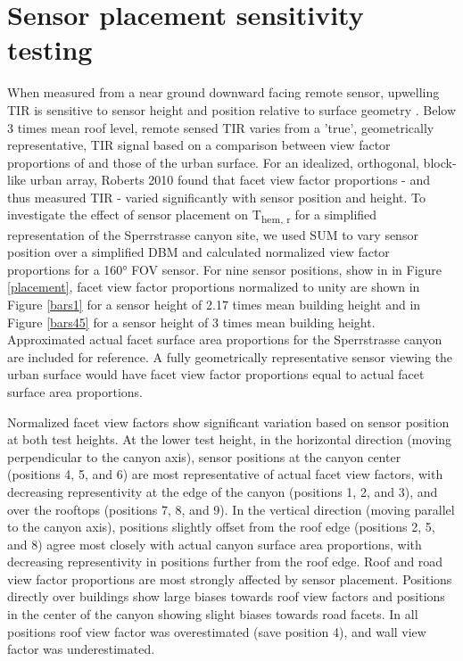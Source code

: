 \section{Sensor placement sensitivity testing} \label{Methodological limitations and considerations}

 When measured from a near ground downward facing remote sensor, upwelling TIR is sensitive to sensor height and position relative to surface geometry \cite{Adderley2015, Roberts2010}. Below 3 times mean roof level, remote sensed TIR varies from a 'true', geometrically representative, TIR signal based on a comparison between view factor proportions of and those of the urban surface. For an idealized, orthogonal, block-like urban array, Roberts 2010 found that facet view factor proportions - and thus measured TIR - varied significantly with sensor position and height. To investigate the effect of sensor placement on T\textsubscript{hem, r} for a simplified representation of the Sperrstrasse canyon site, we used SUM to vary sensor position over a simplified DBM and calculated normalized view factor proportions for a 160\si{\degree} FOV sensor. For nine sensor positions, show in in Figure \ref{placement}, facet view factor proportions normalized to unity are shown in Figure \ref{bars1} for a sensor height of 2.17 times mean building height and in Figure \ref{bars45} for a sensor height of 3 times mean building height. Approximated actual facet surface area proportions for the Sperrstrasse canyon are included for reference. A fully geometrically representative sensor viewing the urban surface would have facet view factor proportions equal to actual facet surface area proportions. 
  
 Normalized facet view factors show significant variation based on sensor position at both test heights. At the lower test height, in the horizontal direction (moving perpendicular to the canyon axis), sensor positions at the canyon center (positions 4, 5, and 6) are most representative of actual facet view factors, with decreasing representivity at the edge of the canyon (positions 1, 2, and 3), and over the rooftops (positions 7, 8, and 9). In the vertical direction (moving parallel to the canyon axis), positions slightly offset from the roof edge (positions 2, 5, and 8) agree most closely with actual canyon surface area proportions, with decreasing representivity in positions further from the roof edge. Roof and road view factor proportions are most strongly affected by sensor placement. Positions directly over buildings show large biases towards roof view factors and positions in the center of the canyon showing slight biases towards road facets. In all positions roof view factor was overestimated (save position 4), and wall view factor was underestimated.
 
